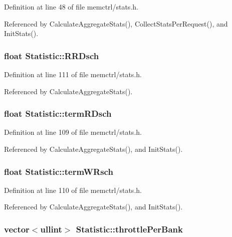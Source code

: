 Definition at line 48 of file memctrl/stats.h.

Referenced by CalculateAggregateStats(), CollectStatsPerRequest(), and InitStats().
\subsubsection[{RRDsch}]{\setlength{\rightskip}{0pt plus 5cm}float {\bf Statistic::RRDsch}}\label{classStatistic_5e6cda6375433255e8980957431049ed}




Definition at line 111 of file memctrl/stats.h.

Referenced by CalculateAggregateStats().
\subsubsection[{termRDsch}]{\setlength{\rightskip}{0pt plus 5cm}float {\bf Statistic::termRDsch}}\label{classStatistic_253c1140210bb47a1941eb1e8cd56481}




Definition at line 109 of file memctrl/stats.h.

Referenced by CalculateAggregateStats(), and InitStats().
\subsubsection[{termWRsch}]{\setlength{\rightskip}{0pt plus 5cm}float {\bf Statistic::termWRsch}}\label{classStatistic_b0e57a691917a55c2469ed1708037711}




Definition at line 110 of file memctrl/stats.h.

Referenced by CalculateAggregateStats(), and InitStats().
\subsubsection[{throttlePerBank}]{\setlength{\rightskip}{0pt plus 5cm}vector$<${\bf ullint}$>$ {\bf Statistic::throttlePerBank}}\label{classStatistic_05c9c20f5f704065c7b75d9804bf41cb}




